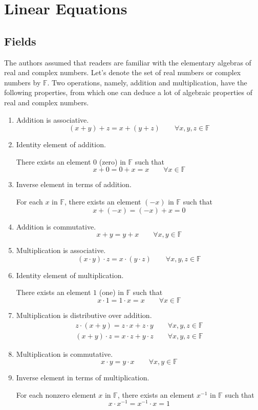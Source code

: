\chapter{Linear Equations}

\section{Fields}

The authors assumed that readers are familiar with the elementary algebras of real and complex numbers. Let's denote the set of real numbers or complex numbers by $\mathbb{F}$. Two operations, namely, addition and multiplication, have the following properties, from which one can deduce a lot of algebraic properties of real and complex numbers.

\begin{enumerate}[label = (\arabic*)]
    \item Addition is associative.
        \[
            (x + y) + z = x + (y + z)\qquad\forall x, y, z\in\mathbb{F}
        \]
    \item Identity element of addition.

        There exists an element $0$ (zero) in $\mathbb{F}$ such that
        \[
            x + 0 = 0 + x = x\qquad\forall x\in\mathbb{F}
        \]
    \item Inverse element in terms of addition.

        For each $x$ in $\mathbb{F}$, there exists an element $(-x)$ in $\mathbb{F}$ such that
        \[
            x + (-x) = (-x) + x = 0
        \]
    \item Addition is commutative.
        \[
            x + y = y + x\qquad\forall x, y\in\mathbb{F}
        \]
    \item Multiplication is associative.
        \[
            (x\cdot y)\cdot z = x\cdot (y\cdot z)\qquad\forall x, y, z\in\mathbb{F}
        \]
    \item Identity element of multiplication.

        There exists an element $1$ (one) in $\mathbb{F}$ such that
        \[
            x\cdot 1 = 1\cdot x = x\qquad\forall x\in\mathbb{F}
        \]
    \item Multiplication is distributive over addition.
        \[
            \begin{split}
                z\cdot (x + y) = z\cdot x + z\cdot y\qquad\forall x, y, z\in\mathbb{F} \\
                (x + y)\cdot z = x\cdot z + y\cdot z\qquad\forall x, y, z\in\mathbb{F}
            \end{split}
        \]
    \item Multiplication is commutative.
        \[
            x\cdot y = y\cdot x\qquad\forall x, y\in\mathbb{F}
        \]
    \item Inverse element in terms of multiplication.

        For each nonzero element $x$ in $\mathbb{F}$, there exists an element $x^{-1}$ in $\mathbb{F}$ such that
        \[
            x\cdot x^{-1} = x^{-1}\cdot x = 1
        \]
\end{enumerate}

